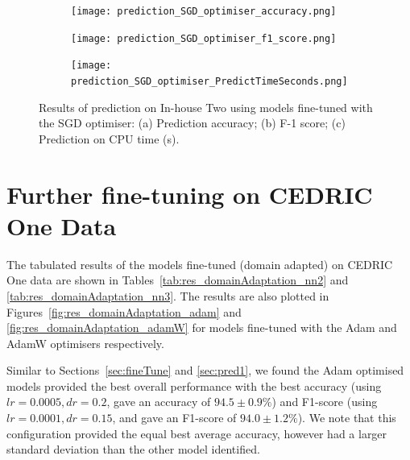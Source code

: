 \documentclass[a4paper,12pt]{article}
\newcommand{\figwidthh}{0.48\textwidth}
\newcommand{\inghamOne}{CEDRIC One\xspace}   %
\begin{document}
\begin{figure}[p] 
	\begin{center}
		\begin{subfigure}[b]{\figwidthh}
			\caption{} 
			\texttt{[image: prediction\_SGD\_optimiser\_accuracy.png]}
		\end{subfigure}
        \hfill
		\begin{subfigure}[b]{\figwidthh}
			\caption{}
			\texttt{[image: prediction\_SGD\_optimiser\_f1\_score.png]}
		\end{subfigure}
        \hfill
		\begin{subfigure}[b]{\figwidthh}
			\caption{}
			\texttt{[image: prediction\_SGD\_optimiser\_PredictTimeSeconds.png]}
		\end{subfigure}
	\end{center}
	\caption{Results of prediction on In-house Two using models fine-tuned with the SGD optimiser: 
	(a) Prediction accuracy; (b) F-1 score; (c) Prediction on CPU time (s).
	} 
	\label{fig:res_predict_SGD}
\end{figure}


\clearpage
\newpage	



\section{Further fine-tuning on \inghamOne Data}
\label{sec:domainAdaptation}

The tabulated results of the models fine-tuned (domain adapted) on \inghamOne data are shown in Tables~\ref{tab:res_domainAdaptation_nn2} and \ref{tab:res_domainAdaptation_nn3}. The results are also plotted in Figures~\ref{fig:res_domainAdaptation_adam} and \ref{fig:res_domainAdaptation_adamW} for models fine-tuned with the Adam and AdamW optimisers respectively.

Similar to Sections~\ref{sec:fineTune} and \ref{sec:pred1}, 
we found the Adam optimised models provided the best overall performance with the best accuracy (using $lr = 0.0005, dr = 0.2$, gave an accuracy of $94.5 \pm 0.9 \%$) and F1-score (using $lr = 0.0001, dr = 0.15$, and gave an F1-score of $94.0 \pm 1.2\%$). We note that this configuration provided the equal best average accuracy, however had a larger standard deviation than the other model identified. 
\end{document}
